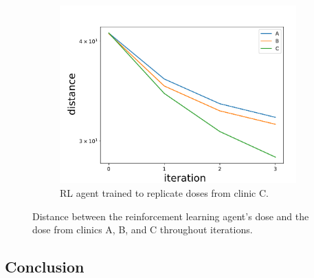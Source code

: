 \begin{figure}
\begin{subfigure}{0.32\linewidth}
		\centering
		\includegraphics[width=\linewidth]{ASTRO/distanceC_semilogy.pdf}
		\caption{RL agent trained to replicate doses from clinic C.}
		\label{fig:RL_clinic_C}
	\end{subfigure}
	\caption{
		Distance between the reinforcement learning agent’s dose and the dose from clinics A, B, and C throughout iterations.
	}
	\label{fig:RL_clinics}
\end{figure}

\subsection{Conclusion}


